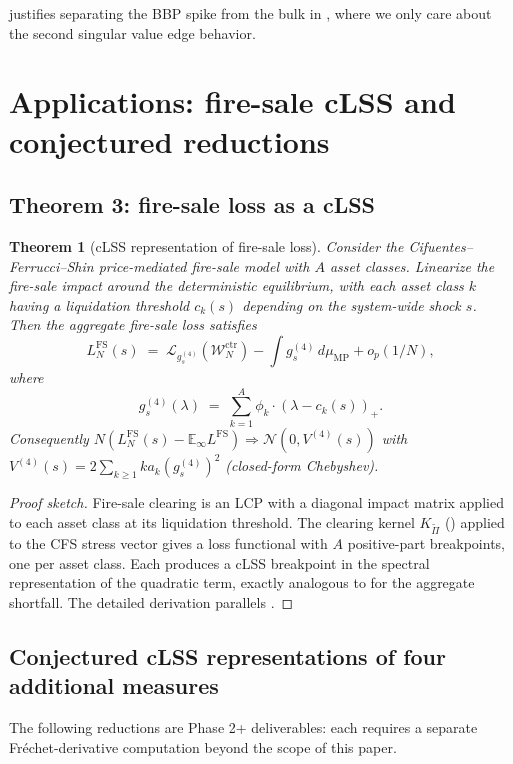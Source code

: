 \documentclass[11pt,a4paper]{article}
\newtheorem{theorem}{Theorem}[section]
\theoremstyle{definition}
\newcommand{\WN}{\mathcal{W}_N^{\mathrm{ctr}}}
\newcommand{\muMP}{\mu_{\mathrm{MP}}}
\newcommand{\Lcal}{\mathcal{L}}
\newcommand{\Kcal}{K_{\widetilde{\Pi}}}
\begin{document}
 justifies separating the BBP spike from the bulk in
, where we only care about the second singular value edge
behavior.

\section{Applications: fire-sale cLSS and conjectured reductions}
\label{sec:applications}

\subsection{Theorem 3: fire-sale loss as a cLSS}

\begin{theorem}[cLSS representation of fire-sale loss]
\label{thm:thm3}
Consider the Cifuentes--Ferrucci--Shin \cite{CFS2005} price-mediated fire-sale
model with $A$ asset classes. Linearize the fire-sale impact around the
deterministic equilibrium, with each asset class $k$ having a liquidation
threshold $c_k(s)$ depending on the system-wide shock $s$. Then the aggregate
fire-sale loss satisfies
\[
L^{\mathrm{FS}}_N(s)\;=\;\Lcal_{g^{(4)}_s}(\WN) - \int g^{(4)}_s\,d\muMP + o_p(1/N),
\]
where
\[
g^{(4)}_s(\lambda)\;=\;\sum_{k=1}^A\phi_k\cdot(\lambda - c_k(s))_+.
\]
Consequently $N(L^{\mathrm{FS}}_N(s) - \mathbb E_\infty L^{\mathrm{FS}})
\Rightarrow\mathcal N(0,V^{(4)}(s))$ with
$V^{(4)}(s) = 2\sum_{k\geq 1}k a_k(g^{(4)}_s)^2$ (closed-form Chebyshev).
\end{theorem}

\begin{proof}[Proof sketch]
Fire-sale clearing is an LCP with a diagonal impact matrix applied to each
asset class at its liquidation threshold. The clearing kernel $\Kcal$
() applied to the CFS stress vector gives a loss
functional with $A$ positive-part breakpoints, one per asset class. Each
produces a cLSS breakpoint in the spectral representation of the quadratic
term, exactly analogous to  for the aggregate shortfall.
The detailed derivation parallels .
\end{proof}

\subsection{Conjectured cLSS representations of four additional measures}

The following reductions are Phase 2+ deliverables: each requires a
separate Fr\'echet-derivative computation beyond the scope of this paper.
\end{document}
